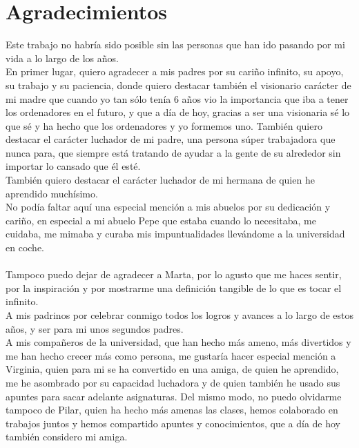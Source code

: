 \section*{Agradecimientos}
\begin{dedicatoria}
	Este trabajo no habría sido posible sin las personas que han ido pasando por mi vida a lo largo de los años. \\
	
	En primer lugar, quiero agradecer a mis padres por su cariño infinito, su apoyo, su trabajo y su paciencia, donde quiero destacar también el visionario carácter de mi madre que cuando yo tan sólo tenía 6 años vio la importancia que iba a tener los ordenadores en el futuro, y que a día de hoy, gracias a ser una visionaria sé lo que sé y ha hecho que los ordenadores y yo formemos uno. También quiero destacar el carácter luchador de mi padre, una persona súper trabajadora que nunca para, que siempre está tratando de ayudar a la gente de su alrededor sin importar lo cansado que él esté. \\
	
	También quiero destacar el carácter luchador de mi hermana de quien he aprendido muchísimo. \\
	
	No podía faltar aquí una especial mención a mis abuelos por su dedicación y cariño, en especial a mi abuelo Pepe que estaba cuando lo necesitaba, me cuidaba, me mimaba y curaba mis impuntualidades llevándome a la universidad en coche. \\ \\
	Tampoco puedo dejar de agradecer a Marta, por lo agusto que me haces sentir, por la inspiración y por mostrarme una definición tangible de lo que es tocar el infinito. \\
	
	A mis padrinos por celebrar conmigo todos los logros y avances a lo largo de estos años, y ser para mi unos segundos padres. \\
	
	A mis compañeros de la universidad, que han hecho más ameno, más divertidos y me han hecho crecer más como persona, me gustaría hacer especial mención a Virginia, quien para mi se ha convertido en una amiga, de quien he aprendido, me he asombrado por su capacidad luchadora y de quien también he usado sus apuntes para sacar adelante asignaturas. Del mismo modo, no puedo olvidarme tampoco de Pilar, quien ha hecho más amenas las clases, hemos colaborado en trabajos juntos y hemos compartido apuntes y conocimientos, que a día de hoy también considero mi amiga. \\
	

\end{dedicatoria}
